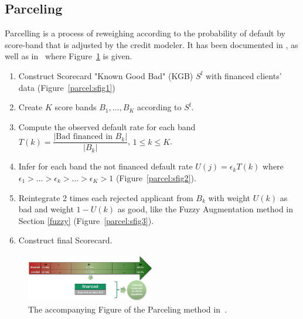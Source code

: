 \subsection{Parceling} \label{Parceling}

Parcelling is a process of reweighing according to the probability of default by score-band that is adjusted by the credit modeler. It has been documented in \cite{saporta,banasik,RI6}, as well as in~\cite{groupe} where Figure~\ref{fig:parceling} is given.

\begin{enumerate}
\item Construct Scorecard "Known Good Bad" (KGB) $S^{\text{f}}$ with financed clients' data (Figure~\ref{parcel:sfig1})
\item Create $K$ score bands $B_1, \ldots, B_K$ according to $S^{\text{f}}$.
\item Compute the observed default rate for each band $T(k) = \dfrac{|\text{Bad financed in } B_k|}{|B_k|}$, $1 \leq k  \leq K$.
\item Infer for each band the not financed default rate $U(j) = \epsilon_k T(k)$ where $\epsilon_1 > \ldots > \epsilon_k > \ldots > \epsilon_K > 1$ (Figure~\ref{parcel:sfig2}).
\item Reintegrate 2 times each rejected applicant from $B_k$ with weight $U(k)$ as bad and weight $1-U(k)$ as good, like the Fuzzy Augmentation method in Section \ref{fuzzy} (Figure~\ref{parcel:sfig3}).
\item Construct final Scorecard.
\end{enumerate}

\begin{figure}
\centering
\includegraphics[width=0.5\textwidth]{figures/appendix/processusParcelling.png}
\caption{The accompanying Figure of the Parceling method in~\cite{groupe}.}
\label{fig:parceling}
\end{figure}



